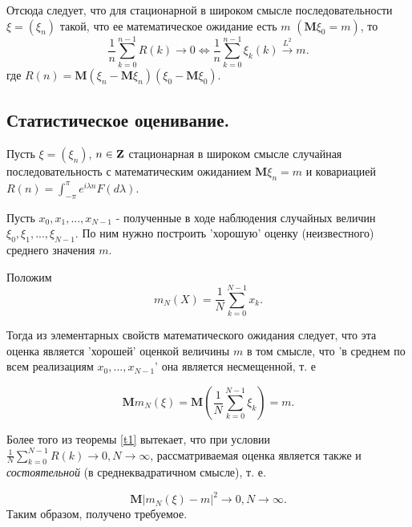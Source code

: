 \begin{corollary}
Отсюда следует, что для стационарной в широком смысле последовательности $\xi = (\xi_n)$ такой, что ее математическое ожидание есть $m$ $(\mathbf{M}\xi_0=m)$, то
\begin{equation}
\frac{1}{n}\sum_{k=0}^{n-1} R(k) \xrightarrow{}0 \Leftrightarrow \frac{1}{n}\sum_{k=0}^{n-1}\xi_k(k) \xrightarrow{L^2}m.
\end{equation}
где $R(n) = \mathbf{M}(\xi_n - \mathbf{M}\xi_n)(\xi_0 - \mathbf{M}\xi_0)$.
\end{corollary}

\subsection{Статистическое оценивание.}
Пусть $\xi = (\xi_n)$, $n \in \mathbf{\bf{Z}}$ стационарная в широком смысле случайная последовательность с математическим ожиданием $\mathbf{M}\xi_n = m$ и ковариацией $R(n) = \int_{-\pi}^{\pi} e^{i\lambda n}F(d\lambda)$.

Пусть $x_0, x_1, ..., x_{N-1}$ - полученные в ходе наблюдения случайных величин $\xi_0, \xi_1, ..., \xi_{N-1}$. По ним нужно построить 'хорошую' оценку (неизвестного) среднего значения $m$.

Положим
\begin{equation}
m_N(X) = \frac{1}{N}\sum_{k=0}^{N-1}x_k.
\end{equation}

Тогда из элементарных свойств математического ожидания следует, что эта оценка является 'хорошей' оценкой величины $m$ в том смысле, что 'в среднем по всем реализациям $x_0, ..., x_{N-1}$'  она является $несмещенной$, т. е

\begin{equation}
\mathbf{M}m_N(\xi) = \mathbf{M}(\frac{1}{N}\sum_{k=0}^{N-1}\xi_k) = m.
\end{equation}

Более того из теоремы \ref{t1} вытекает, что при условии $\frac{1}{N}\sum_{k=0}^{N-1} R(k) \xrightarrow{} 0, N \xrightarrow{} \infty$, рассматриваемая оценка является также и {\em состоятельной} (в среднеквадратичном смысле), т. е.

\begin{equation}
\mathbf{M}|m_N(\xi) - m|^2 \xrightarrow{} 0, N \xrightarrow{} \infty.
\end{equation}
Таким образом, получено требуемое.
